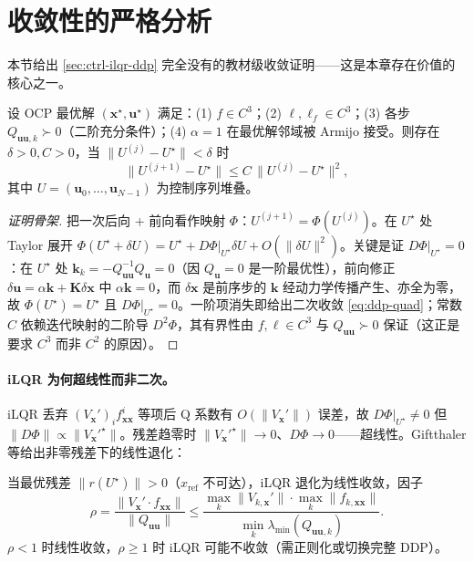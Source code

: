 \section{收敛性的严格分析}
\label{sec:ddp-convergence}

本节给出 \cref{sec:ctrl-ilqr-ddp} 完全没有的教材级收敛证明——这是本章存在价值的核心之一。

\begin{theorem}
\label{thm:ddp-quad-conv}
设 OCP 最优解 $(\mathbf{x}^\star,\mathbf{u}^\star)$ 满足：(1) $f\in C^3$；(2) $\ell,\ell_f\in C^3$；(3) 各步 $Q_{\mathbf{uu},k}\succ0$（二阶充分条件）；(4) $\alpha=1$ 在最优解邻域被 Armijo 接受。则存在 $\delta>0,C>0$，当 $\|U^{(j)}-U^\star\|<\delta$ 时
\begin{equation}
  \|U^{(j+1)}-U^\star\|\le C\,\|U^{(j)}-U^\star\|^2,
  \label{eq:ddp-quad}
\end{equation}
其中 $U=(\mathbf{u}_0,\dots,\mathbf{u}_{N-1})$ 为控制序列堆叠。
\end{theorem}
\begin{proof}[证明骨架]
把一次后向 + 前向看作映射 $\Phi$：$U^{(j+1)}=\Phi(U^{(j)})$。在 $U^\star$ 处 Taylor 展开 $\Phi(U^\star+\delta U)=U^\star+D\Phi|_{U^\star}\delta U+O(\|\delta U\|^2)$。关键是证 $D\Phi|_{U^\star}=0$：在 $U^\star$ 处 $\mathbf{k}_k=-Q_{\mathbf{uu}}^{-1}Q_{\mathbf{u}}=0$（因 $Q_{\mathbf{u}}=0$ 是一阶最优性），前向修正 $\delta\mathbf{u}=\alpha\mathbf{k}+\mathbf{K}\delta\mathbf{x}$ 中 $\alpha\mathbf{k}=0$，而 $\delta\mathbf{x}$ 是前序步的 $\mathbf{k}$ 经动力学传播产生、亦全为零，故 $\Phi(U^\star)=U^\star$ 且 $D\Phi|_{U^\star}=0$。一阶项消失即给出二次收敛 \cref{eq:ddp-quad}；常数 $C$ 依赖迭代映射的二阶导 $D^2\Phi$，其有界性由 $f,\ell\in C^3$ 与 $Q_{\mathbf{uu}}\succ0$ 保证（这正是要求 $C^3$ 而非 $C^2$ 的原因）。
\end{proof}

\paragraph{iLQR 为何超线性而非二次。}\;
iLQR 丢弃 $(V_{\mathbf{x}}')_i f^i_{\mathbf{xx}}$ 等项后 Q 系数有 $O(\|V_{\mathbf{x}}'\|)$ 误差，故 $D\Phi|_{U^\star}\neq0$ 但 $\|D\Phi\|\propto\|V_{\mathbf{x}}'^{\star}\|$。残差趋零时 $\|V_{\mathbf{x}}'^{\star}\|\to0$、$D\Phi\to0$——超线性。Giftthaler 等给出非零残差下的线性退化\cite{giftthaler2018gnms}：

\begin{proposition}
\label{prop:ddp-ilqr-rho}
当最优残差 $\|r(U^\star)\|>0$（$x_{\mathrm{ref}}$ 不可达），iLQR 退化为线性收敛，因子
\begin{equation}
  \rho=\frac{\|V_{\mathbf{x}}'\!\cdot f_{\mathbf{xx}}\|}{\|Q_{\mathbf{uu}}\|}\le\frac{\max_k\|V_{k,\mathbf{x}}'\|\cdot\max_k\|f_{k,\mathbf{xx}}\|}{\min_k\lambda_{\min}(Q_{\mathbf{uu},k})}.
  \label{eq:ddp-rho}
\end{equation}
$\rho<1$ 时线性收敛，$\rho\ge1$ 时 iLQR 可能不收敛（需正则化或切换完整 DDP）。
\end{proposition}

